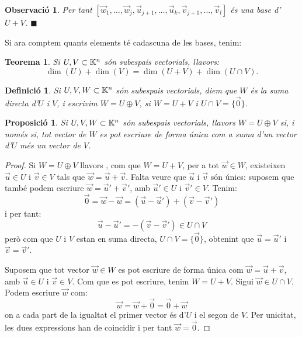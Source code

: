 \documentclass[
  11pt,
]{book}
\numberwithin{dummy}{section}
\theoremstyle{maincolornumbox}
\newtheorem{theorem}{TTTT}[chapter]
\newtheorem{theoremeT}{Teorema}[chapter]
\newtheorem{remarkT}{Observació}[chapter]
\theoremstyle{blacknumex}
\theoremstyle{blacknumbox}
\newtheorem{definitionT}{Definició}[chapter]
\theoremstyle{maincolornum}
\newtheorem{propositionT}{Proposició}[chapter]
\renewenvironment{theorem}{\begin{tBox}\begin{theoremeT}}{\end{theoremeT}\end{tBox}}
\newenvironment{proposition}{\begin{pBox}\begin{propositionT}}{\end{propositionT}\end{pBox}}
\newenvironment{definition}{\begin{dBox}\begin{definitionT}}{\end{definitionT}\end{dBox}}
\newenvironment{remark}{\begin{remarkT}}{\hfill{\tiny\ensuremath{\blacksquare}}\end{remarkT}}
\newlength\esp
\begin{document}
\begin{remark}
Per tant
\([\vec w_1, \dots , \vec w_j,\vec u_{j+1}, \dots, \vec u_k,\vec v_{j+1}, \dots, \vec v_l]\)
és una base d'\(U+V\).
\end{remark}

Si ara comptem quants elements té cadascuna de les bases, tenim:

\begin{theorem}
Si \(U,V \subset \mathbb{K}^n\) són subespais vectorials, llavors:
\[\dim(U)+\dim(V)=\dim(U+V)+\dim(U\cap V) .\]
\end{theorem}

\begin{definition}
Si \(U,V,W \subset \mathbb{K}^n\) són subespais vectorials, diem que \(W\) és la
\emph{suma directa d'\(U\) i \(V\)}, i escrivim \(W=U\oplus V\), si \(W=U+V\) i
\(U\cap V=\{\vec 0\}\).
\end{definition}

\begin{proposition}
Si \(U,V,W\subset \mathbb{K}^n\) són subespais vectorials, llavors \(W=U\oplus V\)
si, i només si, tot vector de \(W\) es pot escriure de forma única com a
suma d'un vector d'\(U\) més un vector de \(V\).
\end{proposition}

\begin{proof}
Si \(W=U\oplus V\) llavors , com que \(W=U+V\), per a tot
\(\vec w\in W\), existeixen \(\vec u\in U\) i \(\vec v \in V\) tals que
\(\vec w=\vec u+\vec v\). Falta veure que \(\vec u\) i \(\vec v\) són únics:
suposem que també podem escriure \(\vec w=\vec u'+\vec v'\), amb
\(\vec u'\in U\) i \(\vec v'\in V\). Tenim:
\[\vec 0 = \vec w - \vec w = (\vec u-\vec u')+(\vec v-\vec v')\] i per
tant: \[\vec u-\vec u'=-(\vec v-\vec v') \in U\cap V\] però com que \(U\)
i \(V\) estan en suma directa, \(U\cap V=\{\vec 0\}\), obtenint que
\(\vec u=\vec u'\) i \(\vec v=\vec v'\).

Suposem que tot vector \(\vec w \in W\) es pot escriure de forma única com
\(\vec w=\vec u+\vec v\), amb \(\vec u \in U\) i \(\vec v \in V\). Com que es
pot escriure, tenim \(W=U+V\). Sigui \(\vec w \in U\cap V\). Podem escriure
\(\vec w\) com: \[\vec w = \vec w + \vec 0 = \vec 0 + \vec w\] on a cada
part de la igualtat el primer vector és d'\(U\) i el segon de \(V\). Per
unicitat, les dues expressions han de coincidir i per tant
\(\vec w = \vec 0\).
\end{proof}
\end{document}
